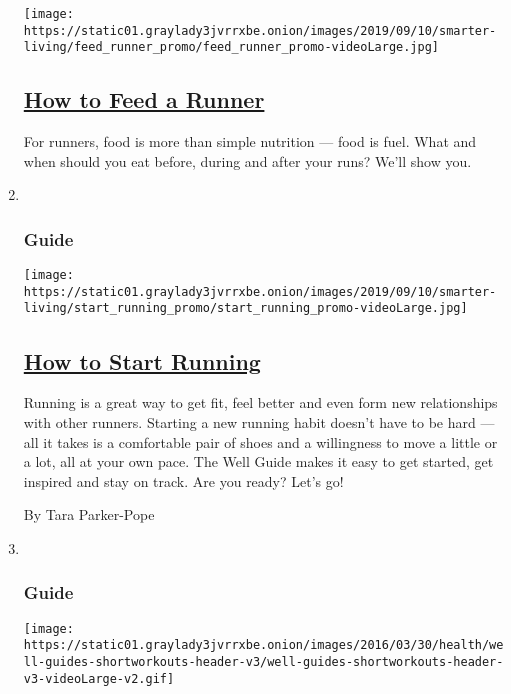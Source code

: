 \begin{enumerate}
  \texttt{[image: https://static01.graylady3jvrrxbe.onion/images/2019/09/10/smarter-living/feed\_runner\_promo/feed\_runner\_promo-videoLarge.jpg]}

  \hypertarget{how-to-feed-a-runner}{%
  \subsection{\texorpdfstring{\href{/interactive/2016/11/29/well/move/well-how-to-feed-a-runner-guide-interactive.html}{How
  to Feed a Runner}}{How to Feed a Runner}}\label{how-to-feed-a-runner}}

  For runners, food is more than simple nutrition --- food is fuel. What
  and when should you eat before, during and after your runs? We'll show
  you.
\item ~
  \hypertarget{guide-3}{%
  \subsubsection{Guide}\label{guide-3}}

  \texttt{[image: https://static01.graylady3jvrrxbe.onion/images/2019/09/10/smarter-living/start\_running\_promo/start\_running\_promo-videoLarge.jpg]}

  \hypertarget{how-to-start-running}{%
  \subsection{\texorpdfstring{\href{/interactive/2016/well/move/well-howtostartrunning-guide-interactive.html}{How
  to Start Running}}{How to Start Running}}\label{how-to-start-running}}

  Running is a great way to get fit, feel better and even form new
  relationships with other runners. Starting a new running habit doesn't
  have to be hard --- all it takes is a comfortable pair of shoes and a
  willingness to move a little or a lot, all at your own pace. The Well
  Guide makes it easy to get started, get inspired and stay on track.
  Are you ready? Let's go!

  By Tara Parker-Pope
\item ~
  \hypertarget{guide-4}{%
  \subsubsection{Guide}\label{guide-4}}

  \texttt{[image: https://static01.graylady3jvrrxbe.onion/images/2016/03/30/health/well-guides-shortworkouts-header-v3/well-guides-shortworkouts-header-v3-videoLarge-v2.gif]}


\end{enumerate}
